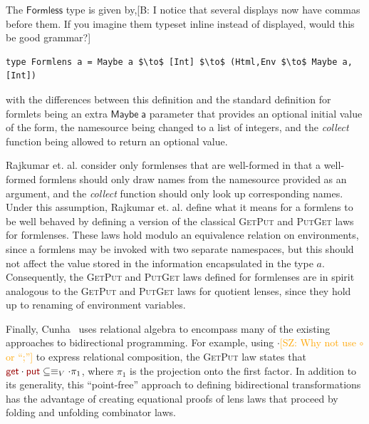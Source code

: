 \documentclass[acmsmall,review,anonymous]{acmart}
\newcommand{\FINISH}[3]{\ifdraft\textcolor{#1}{[#2: #3]}\fi}
\newcommand{\bcp}[1]{\FINISH{dkred}{B}{#1}}
\newcommand{\saz}[1]{\FINISH{orange}{SZ}{#1}}
\newcommand{\codefont}[1]{\ensuremath{\mathsf{#1}}}
\newcommand{\kw}[1]{\textcolor{dkred}{\ensuremath{\mathsf{#1}}}}
\newcommand{\get}{\ensuremath{\kw{get}}}
\newcommand{\lput}{\ensuremath{\kw{put}}}
\begin{document}
The \kw{Formless} type is given by,\bcp{I notice that several displays now
  have commas before them.  If you imagine them typeset inline instead of
  displayed, would this be good grammar?}
\begin{center}
\begin{lstlisting}
type Formlens a = Maybe a $\to$ [Int] $\to$ (Html,Env $\to$ Maybe a,[Int])
\end{lstlisting}
\end{center}
with the differences between this definition and the standard definition for
formlets being an extra \codefont{Maybe\; a} parameter that provides an optional initial
value of the form, the namesource being changed to a list of integers, and the
{\em collect} function being allowed to return an optional value.

Rajkumar et. al. consider only formlenses that are well-formed in that a
well-formed formlens should only draw names from the namesource provided as an
argument, and the {\em collect} function should only look up corresponding
names.
Under this assumption, Rajkumar et. al. define what it means for a formlens to
be well behaved by defining a version of the classical \textsc{GetPut} and \textsc{PutGet} laws
for formlenses. These laws hold modulo an equivalence relation on environments,
since a formlens may be invoked with two separate namespaces, but this should
not affect the value stored in the information encapsulated in the type $a$.
Consequently, the \textsc{GetPut} and \textsc{PutGet} laws defined for formlenses are in spirit
analogous to the \textsc{GetPut} and \textsc{PutGet} laws for quotient lenses, since they hold up
to renaming of environment variables.

Finally, Cunha~\cite{cunha2010relational} uses relational algebra to
encompass many of the existing approaches to bidirectional programming. For
example, using $\cdot$\saz{Why not use $\circ$ or ``;''} to express relational composition, the \textsc{GetPut} law states
that $\get \cdot \lput \subseteq \equiv_V \cdot \pi_1$, where $\pi_1$ is the
projection onto the first factor. In addition to its generality, this
``point-free'' approach to defining bidirectional transformations has the
advantage of creating equational proofs of lens laws that proceed by folding
and unfolding combinator laws.
\end{document}
